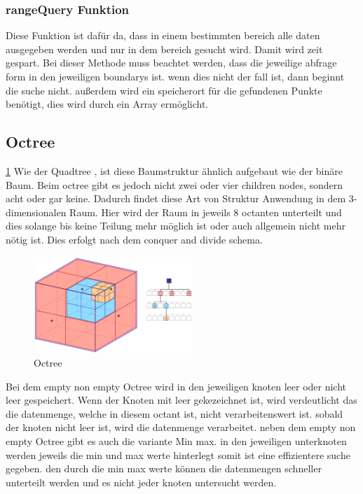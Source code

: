 \documentclass[11pt]{article}
\newcommand{\qt}{Quadtree }
\newcommand{\oc}{Octree }
\newcommand{\fett}[1]{{\bf #1}}
\begin{document}
\subsubsection{rangeQuery Funktion} \label{QuerySuche}
Diese Funktion ist dafür da, dass in einem bestimmten bereich alle daten ausgegeben werden und nur in dem bereich gesucht wird. Damit wird zeit gespart. Bei dieser Methode muss beachtet werden, dass die jeweilige abfrage form in den jeweiligen boundarys ist. 
wenn dies nicht der fall ist, dann beginnt die suche nicht. \newline
außerdem wird ein speicherort für die gefundenen Punkte benötigt, dies wird durch ein Array ermöglicht. 

\pagebreak
\subsection{\fett{\oc}} \ref{Octreeexample}
Wie der \qt , ist diese Baumstruktur ähnlich aufgebaut wie der binäre Baum. Beim octree gibt es jedoch nicht zwei oder vier children nodes, sondern acht oder gar keine. Dadurch findet diese Art von Struktur Anwendung in dem 3-dimensionalen Raum. 
Hier wird der Raum in jeweils 8 octanten unterteilt und dies solange bis keine Teilung mehr möglich ist oder auch allgemein nicht mehr nötig ist. Dies erfolgt nach dem conquer and divide schema. 
\begin{figure}[h]
    \begin{center}
    \includegraphics[width=6cm]{octree.png}
    \caption{Octree}
    \label{Octreeexample}
    
\end{center}
\end{figure}
Bei dem empty non empty \oc wird in den jeweiligen knoten leer oder nicht leer gespeichert. 
Wenn der Knoten mit leer gekezeichnet ist, wird verdeutlicht das die datenmenge, welche in diesem octant ist, nicht verarbeitenswert ist. 
sobald der knoten nicht leer ist, wird die datenmenge verarbeitet. 
neben dem empty non empty \oc gibt es auch die variante Min max. 
in den jeweiligen unterknoten werden jeweils die min und max werte hinterlegt somit ist eine effizientere suche gegeben. den durch die min max werte können die datenmengen schneller unterteilt werden und es nicht jeder knoten untersucht werden. 
\end{document}
